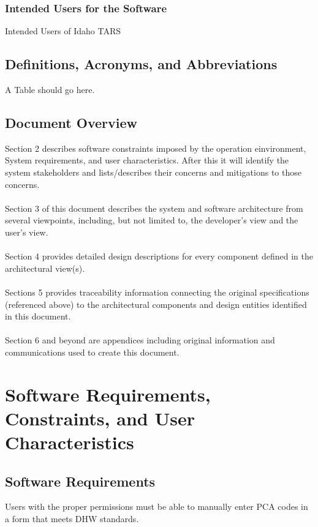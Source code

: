 \documentclass[letterpaper]{article}
\begin{document}
\subsubsection{Intended Users for the Software}
Intended Users of Idaho TARS 


\subsection{\bfseries{Definitions, Acronyms, and Abbreviations}}
A Table should go here. 

\subsection{\bfseries{Document Overview}}
Section 2 describes software constraints imposed by the operation einvironment, System requirements, and user characteristics. After this it will identify the system stakeholders and lists/describes their concerns and mitigations to those concerns. \\
\\
Section 3 of this document describes the system and software
architecture from several viewpoints, including, but not limited to,
the developer{\textquoteright}s view and the user{\textquoteright}s
view.\\
\\
Section 4 provides detailed design descriptions for every component
defined in the architectural view(s). \\
\\
Sections 5 provides traceability information connecting the original specifications
(referenced above) to the architectural components and design entities identified in this document.\\
\\
Section 6 and beyond are appendices including original information and communications used to create this document.
\section{\bfseries{Software Requirements, Constraints, and User Characteristics}}
\subsection{Software Requirements}
 
Users with the proper permissions must be able to manually enter PCA codes in a form that meets DHW standards.
\end{document}
